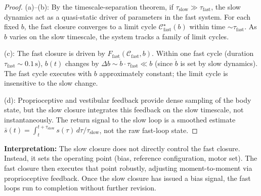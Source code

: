 \begin{proof}
(a)--(b): By the timescale-separation theorem, if $\tau_{\text{slow}} \gg \tau_{\text{fast}}$, the slow dynamics act as a quasi-static driver of parameters in the fast system. For each fixed $b$, the fast closure converges to a limit cycle $\mathcal{C}_{\text{fast}}^{\star}(b)$ within time $\sim \tau_{\text{fast}}$. As $b$ varies on the slow timescale, the system tracks a family of limit cycles.

(c): The fast closure is driven by $F_{\text{fast}}(\mathcal{C}_{\text{fast}}, b)$. Within one fast cycle (duration $\tau_{\text{fast}} \sim 0.1\,\text{s}$), $b(t)$ changes by $\Delta b \sim \dot{b} \cdot \tau_{\text{fast}} \ll b$ (since $\dot{b}$ is set by slow dynamics). The fast cycle executes with $b$ approximately constant; the limit cycle is insensitive to the slow change.

(d): Proprioceptive and vestibular feedback provide dense sampling of the body state, but the slow closure integrates this feedback on the slow timescale, not instantaneously. The return signal to the slow loop is a smoothed estimate $\bar{s}(t) = \int_t^{t+\tau_{\text{slow}}} s(\tau)\,d\tau / \tau_{\text{slow}}$, not the raw fast-loop state.
\end{proof}

\noindent\textbf{Interpretation:} The slow closure does not directly control the fast closure. Instead, it sets the operating point (bias, reference configuration, motor set). The fast closure then executes that point robustly, adjusting moment-to-moment via proprioceptive feedback. Once the slow closure has issued a bias signal, the fast loops run to completion without further revision.


